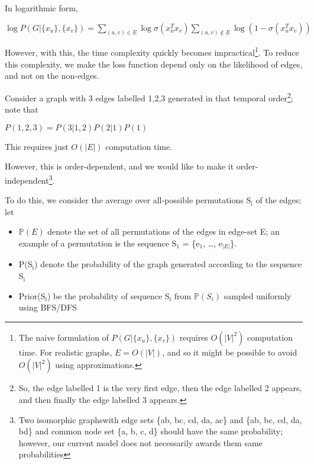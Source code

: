 \documentclass{article}
\begin{document}
In logarithmic form,

\begin{center}
\(\displaystyle \log P(G | \{x_u\}, \{x_v\}) = \sum_{(u,v)\in E} \log \sigma(x_u^T x_v) \sum_{(u,v)\notin E} \log (1 - \sigma(x_u^T x_v))\)
\end{center}

However, with this, the time complexity quickly becomes impractical\footnote{The naive formulation of \(P(G | \{x_u\}, \{x_v\})\) requires \(O(|V|^{\text{2}})\) computation time. For realistic graphs, \(E = O(|V|)\), and so  it might be possible to avoid \(O(|V|^{\text{2}})\) using approximations.}. To reduce this complexity, we make the loss function depend only on the likelihood of edges, and not on the non-edges.

Consider a graph with 3 edges labelled 1,2,3 generated in that temporal order\footnote{So, the edge labelled 1 is the very first edge, then the edge labelled 2 appears, and then finally the edge labelled 3 appears.}; note that

\begin{center}
\(\displaystyle P(1,2,3) = P(3 | 1, 2) P(2 | 1) P(1)\)
\end{center}

This requires just \(O(|E|)\) computation time. 

However, this is order-dependent, and we would like to make it order-independent\footnote{Two isomorphic graphs\footnotemark with edge sets \{ab, bc, cd, da, ac\} and \{ab, bc, cd, da, bd\} and common node set \{a, b, c, d\} should have the same probability\footnotemark; however, our current model does not necessarily awards them same probabilities}. 

To do this, we consider the average over all-possible permutations S\(_{\text{i}}\) of the edges; let

\begin{itemize}
\item \(\mathbb P(E)\) denote the set of all permutations of the edges in edge-set E; an example of a permutation is the sequence S\(_{\text{1}}\) = \{e\(_{\text{1}}\), \ldots{}, e\(_{|E|}\)\}.
\item P(S\(_{\text{i}}\)) denote the probability of the graph generated according to the sequence S\(_{\text{i}}\)
\item Prior(S\(_{\text{i}}\)) be the probability of sequence S\(_{\text{i}}\) from \(\mathbb P(S_i)\) sampled uniformly using BFS/DFS
\end{itemize}
\end{document}
